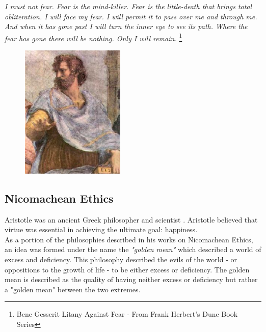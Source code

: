 \documentclass[11pt]{article}
\begin{document}
\begin{center}
\textit{
I must not fear.\linebreak
Fear is the mind-killer.\linebreak
Fear is the little-death that brings total obliteration.\linebreak
I will face my fear.\linebreak
I will permit it to pass over me and through me.\linebreak
And when it has gone past I will turn the inner eye to see its path.\linebreak
Where the fear has gone there will be nothing. \linebreak
Only I will remain.\linebreak
}
\footnote{Bene Gesserit Litany Against Fear - From Frank Herbert's Dune Book Series}
\end{center}

\begin{figure}
    \centering
    \includegraphics[width=0.44\textwidth]{aristotle.jpg}
\end{figure}

\subsection{Nicomachean Ethics}

Aristotle was an ancient Greek philosopher and scientist \cite{aristotle}. 
Aristotle believed that virtue was essential in achieving the ultimate goal: happiness.\\ 
\noindent As a portion of the philosophies described in his works on Nicomachean Ethics, an idea was formed under the name the \textit{"golden mean"} which described a world of excess and deficiency.
This philosophy described the evils of the world - or oppositions to the growth of life - to be either excess or deficiency. 
The golden mean is described as the quality of having neither excess or deficiency but rather a "golden mean" between the two extremes. 
\end{document}
